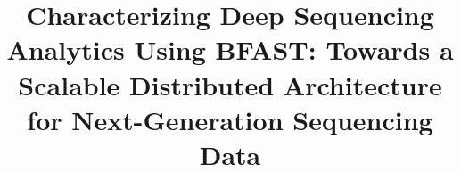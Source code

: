 \documentclass{acm_proc_article-sp}
\begin{document}

\newif\ifdraft
\drafttrue                                                                                                   

\ifdraft
 \newcommand{\reviewer}[1]{ {\textcolor{blue}    { ***Reviewer:     #1 }}}
 \newcommand{\jkimnote}[1]{{\textcolor{green}   { ***Joohyun:   #1 }}}
 \newcommand{\jhanote}[1]{  {\textcolor{red}     { ***SJ: #1 }}}
  \newcommand{\smnote}[1]{  {\textcolor{blue}     { ***sharath: #1 }}}
 \newcommand{\todo}[1]{  {\textcolor{red}     { ***TODO: #1 }}}
 \newcommand{\fix}[1]{  {\textcolor{red}     { ***FIX: #1 }}}

\else
 \newcommand{\reviewer}[1]{}
 \newcommand{\jkimnote}[1]{}
 \newcommand{\jhanote}[1]{}
 \newcommand{\todo}[1]{  {\textcolor{red}     { ***TODO: #1 }}}
 \newcommand{\fix}[1]{}                                                                                     
\fi

\title{Characterizing Deep Sequencing Analytics Using BFAST: Towards a
  Scalable Distributed Architecture for Next-Generation Sequencing
  Data}


%
%
%
%
%
\end{document}

